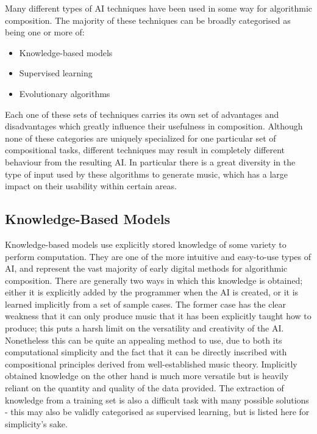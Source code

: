 \documentclass[ author={Stephen Livermore-Tozer},
				supervisor={Dr. Peter Flach},
				degree={MEng},
				title={Algorithmic Co-composition Using Machine Learning},
				subtitle={},
				type={research},
				year={2016} ]{dissertation}
\begin{document}
	Many different types of AI techniques have been used in some way for algorithmic composition. The majority of these techniques can be broadly categorised as being one or more of:
	\begin{itemize}
		\item Knowledge-based models
		\item Supervised learning
		\item Evolutionary algorithms
	\end{itemize}
	Each one of these sets of techniques carries its own set of advantages and disadvantages which greatly influence their usefulness in composition. Although none of these categories are uniquely specialized for one particular set of compositional tasks, different techniques may result in completely different behaviour from the resulting AI. In particular there is a great diversity in the type of input used by these algorithms to generate music, which has a large impact on their usability within certain areas.
	
	\subsection{Knowledge-Based Models}
	\label{sec:knowledge-systems}
	
	Knowledge-based models use explicitly stored knowledge of some variety to perform computation. They are one of the more intuitive and easy-to-use types of AI, and represent the vast majority of early digital methods for algorithmic composition. There are generally two ways in which this knowledge is obtained; either it is explicitly added by the programmer when the AI is created, or it is learned implicitly from a set of sample cases. The former case has the clear weakness that it can only produce music that it has been explicitly taught how to produce; this puts a harsh limit on the versatility and creativity of the AI. Nonetheless this can be quite an appealing method to use, due to both its computational simplicity and the fact that it can be directly inscribed with compositional principles derived from well-established music theory. Implicitly obtained knowledge on the other hand is much more versatile but is heavily reliant on the quantity and quality of the data provided. The extraction of knowledge from a training set is also a difficult task with many possible solutions - this may also be validly categorised as supervised learning, but is listed here for simplicity's sake. 
	
\end{document}

